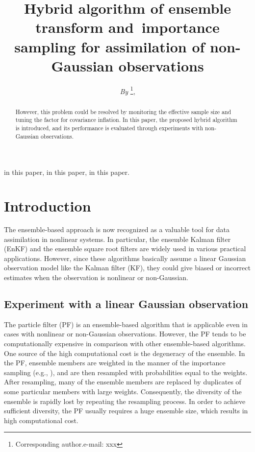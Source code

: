 \documentclass[useAMS,usenatbib]{tellus}
\begin{document}
\title[Hybrid filtering algorithm]{Hybrid algorithm of ensemble transform and~importance sampling
for assimilation of non-Gaussian observations}

\author[\centering AUTHOR]{{\it By} \thanks{Corresponding
author.\hfil\break e-mail: xxx},} 


\maketitle

\begin{abstract}
However, this problem could be resolved by monitoring the effective
sample size and tuning the factor for covariance inflation.
In this paper, the proposed hybrid algorithm is introduced,
and its performance is evaluated through experiments with non-Gaussian
observations.
\end{abstract}

\begin{keywords}
in this paper, in this paper, in this paper.
\end{keywords}

\section{Introduction}
\vspace*{-1pt}
\noindent The ensemble-based approach is now recognized as a valuable tool
for data assimilation in nonlinear systems. In particular, the
ensemble Kalman filter (EnKF) \citep{eve1994,eve2003}
and the ensemble square root filters
\citep{tip+al2003,liv+al2008} are widely used in various practical
applications.
However, since these algorithms basically assume a linear Gaussian observation
model like the Kalman filter (KF),
they could give biased or incorrect estimates when the observation
is nonlinear or non-Gaussian.

\subsection{Experiment with a linear Gaussian observation}

\noindent The particle filter (PF) \citep{gor+al1993,kit1996,lee2009}
is an ensemble-based algorithm that is applicable
even in cases with nonlinear or non-Gaussian observations.
However, the PF tends to be computationally expensive
in comparison with other ensemble-based algorithms.
One source of the high computational cost is the degeneracy of the ensemble.
In the PF, ensemble members are weighted in the manner of the
importance sampling (e.g., \citealp{liu2001,can2009}), and
are then resampled
with probabilities equal to the weights.
After resampling,
many of the ensemble members are replaced by duplicates of some
particular members with large weights.
Consequently, the diversity of the ensemble is rapidly lost by
repeating the resampling process.
In order to achieve sufficient diversity, the PF usually requires
a huge ensemble size, which results in high computational cost.
\end{document}
